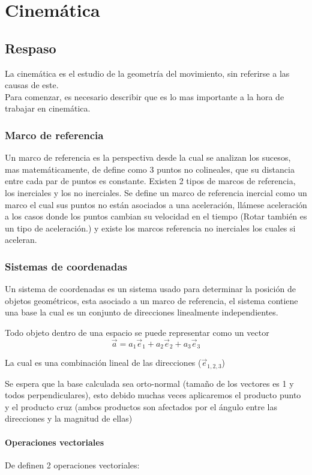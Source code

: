 \chapter{Cinemática}
\section{Respaso}
La cinemática es el estudio de la geometría del movimiento, sin referirse a las causas de este.\\
Para comenzar, es necesario describir que es lo mas importante a la hora de trabajar en cinemática.

\subsection{Marco de referencia}
Un marco de referencia es la perspectiva desde la cual se analizan los sucesos, mas matemáticamente, de define como 3 puntos no colineales, que su distancia entre cada par de puntos es constante.
Existen 2 tipos de marcos de referencia, los inerciales y los no inerciales. Se define un marco de referencia inercial como un marco el cual sus puntos no están asociados a una aceleración, llámese aceleración a los casos donde los puntos cambian su velocidad en el tiempo (Rotar también es un tipo de aceleración.) y existe los marcos referencia no inerciales los cuales si aceleran.


\subsection{Sistemas de coordenadas}
Un sistema de coordenadas es un sistema usado para determinar la posición de objetos geométricos, esta asociado a un marco de referencia, el sistema contiene una base la cual es un conjunto de direcciones linealmente independientes.

Todo objeto dentro de una espacio se puede representar como un vector
$$\Vec{a}=a_1\Vec{e}_1+a_2\Vec{e}_2+a_3\Vec{e}_3$$

La cual es una combinación lineal de las direcciones ($\Vec{e}_{1,2,3}$) 

Se espera que la base calculada sea orto-normal (tamaño de los vectores es 1 y todos perpendiculares), esto debido muchas veces aplicaremos el producto punto y el producto cruz (ambos productos son afectados por el ángulo entre las direcciones y la magnitud de ellas)
\subsubsection{Operaciones vectoriales}
De definen 2 operaciones vectoriales:\\

